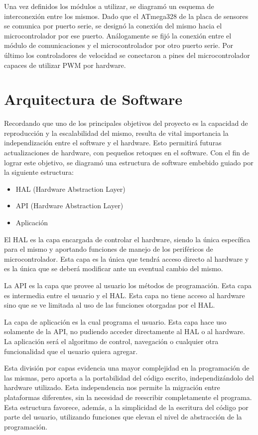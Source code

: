 \documentclass[a4paper, conference]{IEEEtran}
\begin{document}
	Una vez definidos los módulos a utilizar, se diagramó un esquema de interconexión entre los mismos. Dado que el ATmega328 de la placa de sensores se comunica por puerto serie, se designó la conexión del mismo hacia el microcontrolador por ese puerto. Análogamente se fijó la conexión entre el módulo de comunicaciones y el microcontrolador por otro puerto serie. Por último los controladores de velocidad se conectaron a pines del microcontrolador capaces de utilizar PWM por hardware.

\section{Arquitectura de Software}
Recordando que uno de los principales objetivos del proyecto es la capacidad de reproducción y la escalabilidad del mismo, resulta de vital importancia la independización entre el software y el hardware. Esto permitirá futuras actualizaciones de hardware, con pequeños retoques en el software. Con el fin de lograr este objetivo, se diagramó una estructura de software embebido guiado por la siguiente estructura:
\begin{itemize}
\item HAL (Hardware Abstraction Layer)
\item API  (Hardware Abstraction Layer)
\item Aplicación 
\end{itemize}

El HAL es la capa encargada de controlar el hardware, siendo la única específica para el mismo y aportando funciones de manejo de los periféricos de microcontrolador. Esta capa es la única que tendrá acceso directo al hardware y es la única que se deberá modificar ante un eventual cambio del mismo.

La API es la capa que provee al usuario los métodos de programación. Esta capa es intermedia entre el usuario y el HAL. Esta capa no tiene acceso al hardware sino que se ve limitada al uso de las funciones otorgadas por el HAL.

La capa de aplicación es la cual programa el usuario. Esta capa hace uso solamente de la API, no pudiendo acceder directamente al HAL o al hardware. La aplicación será el algoritmo de control, navegación o cualquier otra funcionalidad que el usuario quiera agregar.

Esta división por capas evidencia una mayor complejidad en la programación de las mismas, pero aporta a la portabilidad del código escrito, independizándolo del hardware utilizado. Esta independencia nos permite la migración entre plataformas diferentes, sin la necesidad de reescribir completamente el programa. Esta estructura favorece, además, a la simplicidad de la escritura del código por parte del usuario, utilizando funciones que elevan el nivel de abstracción de la programación.
\end{document}
